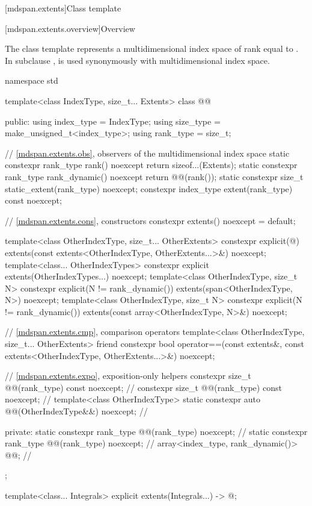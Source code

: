[mdspan.extents]{Class template }

[mdspan.extents.overview]{Overview}

The class template  represents
a multidimensional index space of rank equal to .
In subclause ,
 is used synonymously with multidimensional index space.

\begin{codeblock}
namespace std {
  template<class IndexType, size_t... Extents>
  class @@ {
  public:
    using index_type = IndexType;
    using size_type = make_unsigned_t<index_type>;
    using rank_type = size_t;

    // \ref{mdspan.extents.obs}, observers of the multidimensional index space
    static constexpr rank_type rank() noexcept { return sizeof...(Extents); }
    static constexpr rank_type rank_dynamic() noexcept { return @@(rank()); }
    static constexpr size_t static_extent(rank_type) noexcept;
    constexpr index_type extent(rank_type) const noexcept;

    // \ref{mdspan.extents.cons}, constructors
    constexpr extents() noexcept = default;

    template<class OtherIndexType, size_t... OtherExtents>
      constexpr explicit(@\seebelow@)
        extents(const extents<OtherIndexType, OtherExtents...>&) noexcept;
    template<class... OtherIndexTypes>
      constexpr explicit extents(OtherIndexTypes...) noexcept;
    template<class OtherIndexType, size_t N>
      constexpr explicit(N != rank_dynamic())
        extents(span<OtherIndexType, N>) noexcept;
    template<class OtherIndexType, size_t N>
      constexpr explicit(N != rank_dynamic())
        extents(const array<OtherIndexType, N>&) noexcept;

    // \ref{mdspan.extents.cmp}, comparison operators
    template<class OtherIndexType, size_t... OtherExtents>
      friend constexpr bool operator==(const extents&,
                                       const extents<OtherIndexType, OtherExtents...>&) noexcept;

    // \ref{mdspan.extents.expo}, exposition-only helpers
    constexpr size_t @@(rank_type) const noexcept;     // \expos
    constexpr size_t @@(rank_type) const noexcept;     // \expos
    template<class OtherIndexType>
      static constexpr auto @@(OtherIndexType&&) noexcept;      // \expos

  private:
    static constexpr rank_type @@(rank_type) noexcept;       // \expos
    static constexpr rank_type @@(rank_type) noexcept;   // \expos
    array<index_type, rank_dynamic()> @@{};                // \expos
  };

  template<class... Integrals>
    explicit extents(Integrals...)
      -> @\seebelow@;
}
\end{codeblock}


